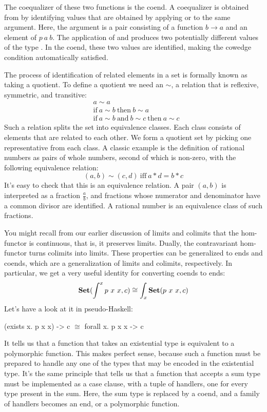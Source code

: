 The coequalizer of these two functions is the coend. A coequalizer is
obtained from  by identifying values that are
obtained by applying  or  to the same
argument. Here, the argument is a pair consisting of a function
$b \to a$ and an element of $p\ a\ b$. The
application of  and  produces two potentially
different values of the type . In the coend, these
two values are identified, making the cowedge condition automatically
satisfied.

The process of identification of related elements in a set is formally
known as taking a quotient. To define a quotient we need an
 $\sim$, a relation that
is reflexive, symmetric, and transitive:
\begin{align*}
   & a \sim a                                                         \\
   & \text{if}\ a \sim b\ \text{then}\ b \sim a                       \\
   & \text{if}\ a \sim b\ \text{and}\ b \sim c\ \text{then}\ a \sim c
\end{align*}
Such a relation splits the set into equivalence classes. Each class
consists of elements that are related to each other. We form a quotient
set by picking one representative from each class. A classic example is
the definition of rational numbers as pairs of whole numbers, second of
which is non-zero, with the following equivalence relation:
\[(a, b) \sim (c, d)\ \text{iff}\ a * d = b * c\]
It's easy to check that this is an equivalence relation. A pair
$(a, b)$ is interpreted as a fraction $\frac{a}{b}$, and
fractions whose numerator and denominator have a common divisor are identified. A rational number
is an equivalence class of such fractions.

You might recall from our earlier discussion of limits and colimits that
the hom-functor is continuous, that is, it preserves limits. Dually, the
contravariant hom-functor turns colimits into limits. These properties
can be generalized to ends and coends, which are a generalization of
limits and colimits, respectively. In particular, we get a very useful
identity for converting coends to ends:
\[\Set(\int^x p\ x\ x, c) \cong \int_x \Set(p\ x\ x, c)\]
Let's have a look at it in pseudo-Haskell:

\begin{snipv}
(exists x. p x x) -> c \ensuremath{\cong} forall x. p x x -> c
\end{snipv}
It tells us that a function that takes an existential type is equivalent
to a polymorphic function. This makes perfect sense, because such a
function must be prepared to handle any one of the types that may be
encoded in the existential type. It's the same principle that tells us
that a function that accepts a sum type must be implemented as a case
clause, with a tuple of handlers, one for every type present in the
sum. Here, the sum type is replaced by a coend, and a family of handlers
becomes an end, or a polymorphic function.

